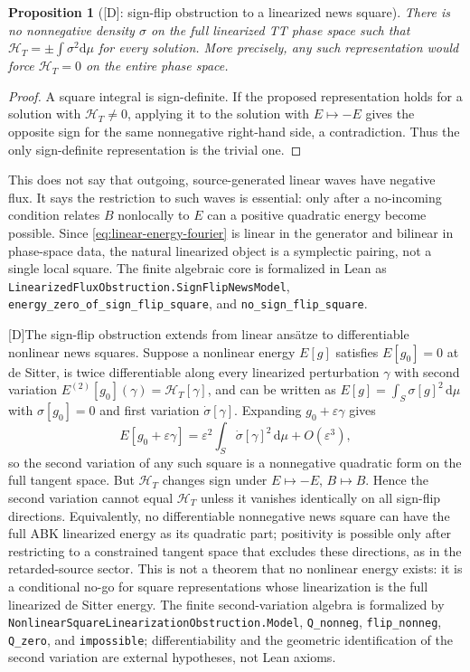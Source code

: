 \documentclass[11pt,a4paper]{article}
\newtheorem{proposition}[theorem]{Proposition}
\newcommand{\cH}{\mathcal{H}}
\newcommand{\diff}{\mathrm{d}}
\newcommand{\statusD}{\textsf{[D]}}
\begin{document}
\begin{proposition}[\statusD: sign-flip obstruction to a linearized news square]
There is no nonnegative density \(\sigma\) on the full linearized TT phase space such that \(\cH_T=\pm\int\sigma^2\diff\mu\) for every solution.  More precisely, any such representation would force \(\cH_T=0\) on the entire phase space.
\end{proposition}
\begin{proof}
A square integral is sign-definite.  If the proposed representation holds for a solution with \(\cH_T\neq0\), applying it to the solution with \(E\mapsto-E\) gives the opposite sign for the same nonnegative right-hand side, a contradiction.  Thus the only sign-definite representation is the trivial one.
\end{proof}

This does not say that outgoing, source-generated linear waves have negative flux.  It says the restriction to such waves is essential: only after a no-incoming condition relates \(B\) nonlocally to \(E\) can a positive quadratic energy become possible.  Since \eqref{eq:linear-energy-fourier} is linear in the generator and bilinear in phase-space data, the natural linearized object is a symplectic pairing, not a single local square.  The finite algebraic core is formalized in Lean as \texttt{LinearizedFluxObstruction.SignFlipNewsModel}, \texttt{energy\_zero\_of\_sign\_flip\_square}, and \texttt{no\_sign\_flip\_square}.

\statusD The sign-flip obstruction extends from linear ans\"atze to differentiable nonlinear news squares.  Suppose a nonlinear energy \(E[g]\) satisfies \(E[g_0]=0\) at de Sitter, is twice differentiable along every linearized perturbation \(\gamma\) with second variation \(E^{(2)}[g_0](\gamma)=\cH_T[\gamma]\), and can be written as \(E[g]=\int_S \sigma[g]^2\,\diff\mu\) with \(\sigma[g_0]=0\) and first variation \(\dot\sigma[\gamma]\).  Expanding \(g_0+\varepsilon\gamma\) gives
\[
  E[g_0+\varepsilon\gamma]
  =
  \varepsilon^2\int_S\dot\sigma[\gamma]^2\,\diff\mu+O(\varepsilon^3),
\]
so the second variation of any such square is a nonnegative quadratic form on the full tangent space.  But \(\cH_T\) changes sign under \(E\mapsto-E\), \(B\mapsto B\).  Hence the second variation cannot equal \(\cH_T\) unless it vanishes identically on all sign-flip directions.  Equivalently, no differentiable nonnegative news square can have the full ABK linearized energy as its quadratic part; positivity is possible only after restricting to a constrained tangent space that excludes these directions, as in the retarded-source sector.  This is not a theorem that no nonlinear energy exists: it is a conditional no-go for square representations whose linearization is the full linearized de Sitter energy.  The finite second-variation algebra is formalized by \texttt{NonlinearSquareLinearizationObstruction.Model}, \texttt{Q\_nonneg}, \texttt{flip\_nonneg}, \texttt{Q\_zero}, and \texttt{impossible}; differentiability and the geometric identification of the second variation are external hypotheses, not Lean axioms.
\end{document}
